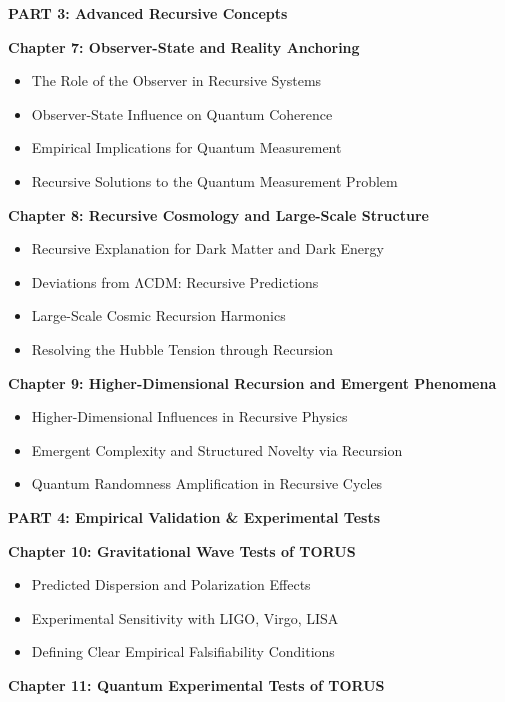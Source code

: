 \textbf{PART 3: Advanced Recursive Concepts}

\textbf{Chapter 7: Observer-State and Reality Anchoring}

\begin{itemize}
\item
  The Role of the Observer in Recursive Systems
\item
  Observer-State Influence on Quantum Coherence
\item
  Empirical Implications for Quantum Measurement
\item
  Recursive Solutions to the Quantum Measurement Problem
\end{itemize}

\textbf{Chapter 8: Recursive Cosmology and Large-Scale Structure}

\begin{itemize}
\item
  Recursive Explanation for Dark Matter and Dark Energy
\item
  Deviations from ΛCDM: Recursive Predictions
\item
  Large-Scale Cosmic Recursion Harmonics
\item
  Resolving the Hubble Tension through Recursion
\end{itemize}

\textbf{Chapter 9: Higher-Dimensional Recursion and Emergent Phenomena}

\begin{itemize}
\item
  Higher-Dimensional Influences in Recursive Physics
\item
  Emergent Complexity and Structured Novelty via Recursion
\item
  Quantum Randomness Amplification in Recursive Cycles
\end{itemize}

\textbf{PART 4: Empirical Validation \& Experimental Tests}

\textbf{Chapter 10: Gravitational Wave Tests of TORUS}

\begin{itemize}
\item
  Predicted Dispersion and Polarization Effects
\item
  Experimental Sensitivity with LIGO, Virgo, LISA
\item
  Defining Clear Empirical Falsifiability Conditions
\end{itemize}

\textbf{Chapter 11: Quantum Experimental Tests of TORUS}

